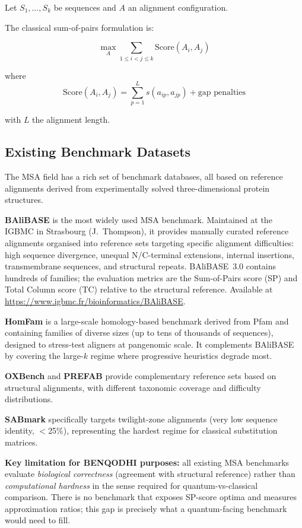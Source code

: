 \documentclass[11pt]{article}
\begin{document}
Let $S_1, \dots, S_k$ be sequences and $A$ an alignment configuration.

The classical sum-of-pairs formulation is:

\[
\max_{A} \sum_{1 \le i < j \le k} \text{Score}(A_i, A_j)
\]

where
\[
\text{Score}(A_i, A_j) = \sum_{p=1}^{L} s(a_{ip}, a_{jp}) + \text{gap penalties}
\]

with $L$ the alignment length.

\subsection*{Existing Benchmark Datasets}

The MSA field has a rich set of benchmark databases, all based on reference alignments
derived from experimentally solved three-dimensional protein structures.

\textbf{BAliBASE} \cite{Thompson1999,BAliBASE3} is the most widely used MSA benchmark.
Maintained at the IGBMC in Strasbourg (J.~Thompson), it provides manually curated
reference alignments organised into reference sets targeting specific alignment
difficulties: high sequence divergence, unequal N/C-terminal extensions, internal
insertions, transmembrane sequences, and structural repeats. BAliBASE~3.0 contains
hundreds of families; the evaluation metrics are the Sum-of-Pairs score (SP) and
Total Column score (TC) relative to the structural reference. 
Available at \url{https://www.igbmc.fr/bioinformatics/BAliBASE}.

\textbf{HomFam} \cite{HomFam2010} is a large-scale homology-based benchmark derived from
Pfam and containing families of diverse sizes (up to tens of thousands of sequences),
designed to stress-test aligners at pangenomic scale. It complements BAliBASE by
covering the large-$k$ regime where progressive heuristics degrade most.

\textbf{OXBench} \cite{OXBench2003} and \textbf{PREFAB} \cite{PREFAB2004} provide
complementary reference sets based on structural alignments, with different taxonomic
coverage and difficulty distributions.

\textbf{SABmark} \cite{SABmark2005} specifically targets twilight-zone alignments (very
low sequence identity, $<$25\%), representing the hardest regime for classical substitution
matrices.

\textbf{Key limitation for BENQODHI purposes:} all existing MSA benchmarks evaluate
\emph{biological correctness} (agreement with structural reference) rather than
\emph{computational hardness} in the sense required for quantum-vs-classical comparison.
There is no benchmark that exposes SP-score optima and measures approximation ratios;
this gap is precisely what a quantum-facing benchmark would need to fill.
\end{document}

